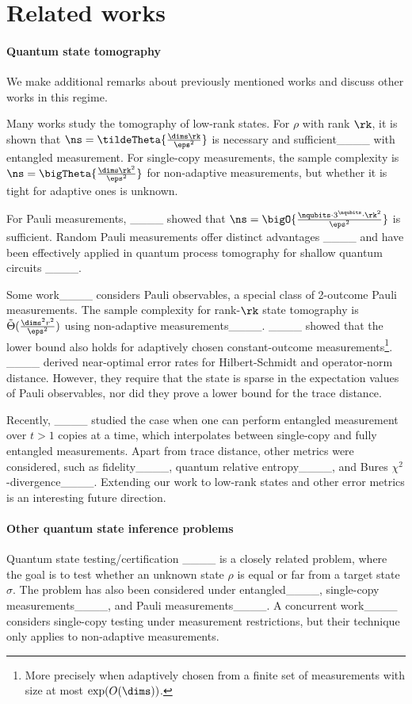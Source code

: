 \section{Related works}
\paragraph{Quantum state tomography} We make additional remarks about previously mentioned works and discuss other works in this regime.

Many works study the tomography of low-rank states. 
For $\rho$ with rank $\rk$, it is shown that $\ns = \tildeTheta{\frac{\dims \rk}{\eps^2}}$ is necessary and sufficient____ with entangled measurement. 
For single-copy measurements, the sample complexity is $\ns=\bigTheta{\frac{\dims \rk^2}{\eps^2}}$ for non-adaptive measurements, but whether it is tight for adaptive ones is unknown. 

For Pauli measurements, ____ showed that $\ns=\bigO{\frac{\nqubits \cdot 3^\nqubits\cdot \rk^2}{\eps^2}}$ is sufficient. 
Random Pauli measurements offer distinct advantages ____ and have been effectively applied in quantum process tomography for shallow quantum circuits ____. 

Some work____ considers Pauli observables, a special class of 2-outcome Pauli measurements. The sample complexity for rank-$\rk$ state tomography is ${\tilde{{\Theta}}}(\frac{\dims^2 r^2}{\eps^2})$ using non-adaptive measurements____. ____ showed that the lower bound also holds for adaptively chosen constant-outcome measurements\footnote{More precisely when adaptively chosen from a finite set of measurements with size at most $\exp(O(\dims))$.}. ____ derived near-optimal error rates for Hilbert-Schmidt and operator-norm distance. However, they require that the state is sparse in the expectation values of Pauli observables, nor did they prove a lower bound for the trace distance. 


Recently, ____ studied the case when one can perform entangled measurement over $t>1$ copies at a time, which interpolates between single-copy and fully entangled measurements. Apart from trace distance, other metrics were considered, such as fidelity____, quantum relative entropy____, and Bures $\chi^2$-divergence____. Extending our work to low-rank states and other error metrics is an interesting future direction.
 



\paragraph{Other quantum state inference problems} Quantum state testing/certification ____ is a closely related problem, where the goal is to test whether an unknown state $\rho$ is equal or far from a target state $\sigma$. The problem has also been considered under entangled____, single-copy measurements____, and Pauli measurements____. A concurrent work____ considers single-copy testing under measurement restrictions, but their technique only applies to non-adaptive measurements.

